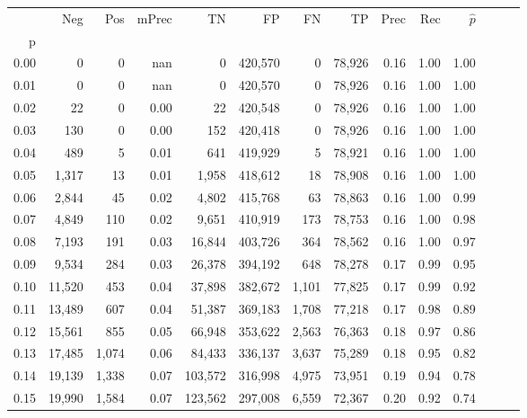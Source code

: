 \begin{tabular}{rrrrrrrrrrrrrr}
\toprule
{} &     Neg &    Pos & mPrec &       TN &       FP &      FN &      TP &  Prec &   Rec & $\hat{p}$ \\
p    &         &        &       &          &          &         &         &       &       &           \\
\midrule
0.00 &       0 &      0 &   nan &        0 &  420,570 &       0 &  78,926 &  0.16 &  1.00 &      1.00 \\
0.01 &       0 &      0 &   nan &        0 &  420,570 &       0 &  78,926 &  0.16 &  1.00 &      1.00 \\
0.02 &      22 &      0 &  0.00 &       22 &  420,548 &       0 &  78,926 &  0.16 &  1.00 &      1.00 \\
0.03 &     130 &      0 &  0.00 &      152 &  420,418 &       0 &  78,926 &  0.16 &  1.00 &      1.00 \\
0.04 &     489 &      5 &  0.01 &      641 &  419,929 &       5 &  78,921 &  0.16 &  1.00 &      1.00 \\
0.05 &   1,317 &     13 &  0.01 &    1,958 &  418,612 &      18 &  78,908 &  0.16 &  1.00 &      1.00 \\
0.06 &   2,844 &     45 &  0.02 &    4,802 &  415,768 &      63 &  78,863 &  0.16 &  1.00 &      0.99 \\
0.07 &   4,849 &    110 &  0.02 &    9,651 &  410,919 &     173 &  78,753 &  0.16 &  1.00 &      0.98 \\
0.08 &   7,193 &    191 &  0.03 &   16,844 &  403,726 &     364 &  78,562 &  0.16 &  1.00 &      0.97 \\
0.09 &   9,534 &    284 &  0.03 &   26,378 &  394,192 &     648 &  78,278 &  0.17 &  0.99 &      0.95 \\
0.10 &  11,520 &    453 &  0.04 &   37,898 &  382,672 &   1,101 &  77,825 &  0.17 &  0.99 &      0.92 \\
0.11 &  13,489 &    607 &  0.04 &   51,387 &  369,183 &   1,708 &  77,218 &  0.17 &  0.98 &      0.89 \\
0.12 &  15,561 &    855 &  0.05 &   66,948 &  353,622 &   2,563 &  76,363 &  0.18 &  0.97 &      0.86 \\
0.13 &  17,485 &  1,074 &  0.06 &   84,433 &  336,137 &   3,637 &  75,289 &  0.18 &  0.95 &      0.82 \\
0.14 &  19,139 &  1,338 &  0.07 &  103,572 &  316,998 &   4,975 &  73,951 &  0.19 &  0.94 &      0.78 \\
0.15 &  19,990 &  1,584 &  0.07 &  123,562 &  297,008 &   6,559 &  72,367 &  0.20 &  0.92 &      0.74 \\

\end{tabular}
